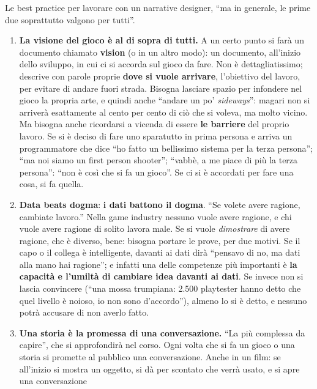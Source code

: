 Le best practice per lavorare con un narrative designer, ``ma in generale, le
prime due soprattutto valgono per tutti''.
\begin{enumerate}
  \item \textbf{La visione del gioco è al di sopra di tutti.} A un certo
        punto si farà un documento chiamato \textbf{vision} (o in un altro
        modo): un documento, all'inizio dello sviluppo, in cui ci si accorda
        sul gioco da fare. Non è dettagliatissimo; descrive con parole proprie
        \textbf{dove si vuole arrivare}, l'obiettivo del lavoro, per evitare
        di andare fuori strada. Bisogna lasciare spazio per infondere nel
        gioco la propria arte, e quindi anche ``andare un po' \emph{sideways}'':
        magari non si arriverà esattamente al cento per cento di ciò che si
        voleva, ma molto vicino. Ma bisogna anche ricordarsi a vicenda di
        essere \textbf{le barriere} del proprio lavoro. Se si è deciso di
        fare uno sparatutto in prima persona e arriva un programmatore che
        dice ``ho fatto un bellissimo sistema per la terza persona''; ``ma
        noi siamo un first person shooter''; ``vabbè, a me piace di più la
        terza persona'': ``non è così che si fa un gioco''. Se ci si è
        accordati per fare una cosa, si fa quella.
  \item \textbf{Data beats dogma}: \textbf{i dati battono il dogma}. ``Se
        volete avere ragione, cambiate lavoro.'' Nella game industry nessuno
        vuole avere ragione, e chi vuole avere ragione di solito lavora male.
        Se si vuole \emph{dimostrare} di avere ragione, che è diverso, bene:
        bisogna portare le prove, per due motivi. Se il capo o il collega è
        intelligente, davanti ai dati dirà ``pensavo di no, ma dati alla mano
        hai ragione''; e infatti una delle competenze più importanti è
        \textbf{la capacità e l'umiltà di cambiare idea davanti ai dati}. Se
        invece non si lascia convincere (``una mossa trumpiana: 2.500
        playtester hanno detto che quel livello è noioso, io non sono
        d'accordo''), almeno lo si è detto, e nessuno potrà accusare di non
        averlo fatto.
  \item \textbf{Una storia è la promessa di una conversazione.} ``La più
        complessa da capire'', che si approfondirà nel corso. Ogni volta che
        si fa un gioco o una storia si promette al pubblico una
        conversazione. Anche in un film: se all'inizio si mostra un oggetto,
        si dà per scontato che verrà usato, e si apre una conversazione

\end{enumerate}
